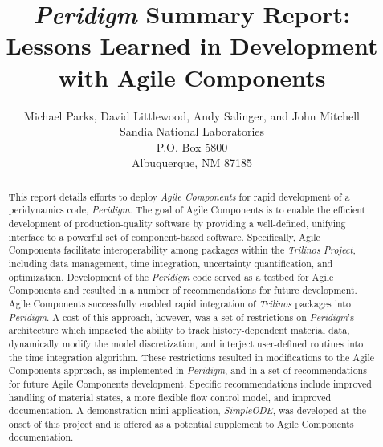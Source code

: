 \documentclass[pdf,ps2pdf,12pt,report]{SANDreport}
\title{\emph{Peridigm} Summary Report:\\Lessons Learned in Development with Agile Components}
\author{Michael Parks, David Littlewood, Andy Salinger, and John Mitchell \\
	  Sandia National Laboratories\\
	  P.O. Box 5800\\
	  Albuquerque, NM 87185 \\
	 }
\date{}
\theoremstyle{plain}
\theoremstyle{definition}
\theoremstyle{remark}
\numberwithin{equation}{section}
\begin{document}
    \maketitle

\begin{abstract}
This report details efforts to deploy \emph{Agile Components} for rapid development of a peridynamics code, \emph{Peridigm}.  The goal of Agile Components is to enable the efficient development of production-quality software by providing a well-defined, unifying interface to a powerful set of component-based software.  Specifically, Agile Components facilitate interoperability among packages within the \emph{Trilinos Project}, including data management, time integration, uncertainty quantification, and optimization. Development of the \emph{Peridigm} code served as a testbed for Agile Components and resulted in a number of recommendations for future development.  Agile Components successfully enabled rapid integration of \emph{Trilinos} packages into \emph{Peridigm}.  A cost of this approach, however, was a set of restrictions on \emph{Peridigm}'s architecture which impacted the ability to track history-dependent material data, dynamically modify the model discretization, and interject user-defined routines into the time integration algorithm.  These restrictions resulted in modifications to the Agile Components approach, as implemented in \emph{Peridigm}, and in a set of recommendations for future Agile Components development.  Specific recommendations include improved handling of material states, a more flexible flow control model, and improved documentation.  A demonstration mini-application, \emph{SimpleODE}, was developed at the onset of this project and is offered as a potential supplement to Agile Components documentation.
\end{abstract}


    \cleardoublepage		%
    \tableofcontents
    \listoffigures


\end{document}
